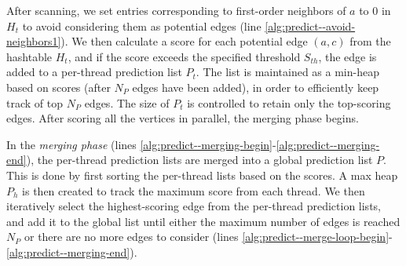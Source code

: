 After scanning, we set entries corresponding to first-order neighbors of $a$ to $0$ in $H_t$ to avoid considering them as potential edges (line \ref{alg:predict--avoid-neighbors1}). We then calculate a score for each potential edge $(a, c)$ from the hashtable $H_t$, and if the score exceeds the specified threshold $S_{th}$, the edge is added to a per-thread prediction list $P_t$. The list is maintained as a min-heap based on scores (after $N_P$ edges have been added), in order to efficiently keep track of top $N_P$ edges. The size of $P_t$ is controlled to retain only the top-scoring edges. After scoring all the vertices in parallel, the merging phase begins.

In the \textit{merging phase} (lines \ref{alg:predict--merging-begin}-\ref{alg:predict--merging-end}), the per-thread prediction lists are merged into a global prediction list $P$. This is done by first sorting the per-thread lists based on the scores. A max heap $P_h$ is then created to track the maximum score from each thread. We then iteratively select the highest-scoring edge from the per-thread prediction lists, and add it to the global list until either the maximum number of edges is reached $N_P$ or there are no more edges to consider (lines \ref{alg:predict--merge-loop-begin}-\ref{alg:predict--merging-end}).



